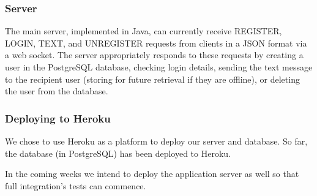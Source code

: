 \subsubsection{Server} 

The main server, implemented in Java, can currently receive REGISTER, LOGIN, TEXT, and UNREGISTER requests from clients in a JSON format via a web socket. The server appropriately responds to these requests by creating a user in the PostgreSQL database, checking login details, sending the text message to the recipient user (storing for future retrieval if they are offline), or deleting the user from the database. 

\subsubsection{Deploying to Heroku}

We chose to use Heroku as a platform to deploy our server and database. So far, the database (in PostgreSQL) has been deployed to Heroku.

In the coming weeks we intend to deploy the application server as well so that full integration's tests can commence.